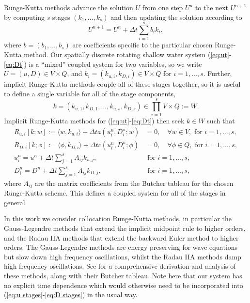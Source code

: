 \documentclass[a4paper, 12pt]{article}
\begin{document}
Runge-Kutta methods advance the solution $U$ from one step $U^n$ to
the next $U^{n+1}$ by computing $s$ stages $(k_1,\ldots,k_s)$ and then
updating the solution according to
\begin{equation}
  U^{n+1} = U^n + \Delta t\sum_{i=1}^s b_i k_i,
\end{equation}
where $b=(b_1,\ldots, b_s)$ are coefficients specific to the
particular chosen Runge-Kutta method. Our spatially discrete rotating
shallow water system (\ref{eq:ut}-\ref{eq:Dt}) is a ``mixed'' coupled
system for two variables, so we write $U=(u,D)\in V\times Q$, and $k_i
= (k_{u,i},k_{D,i})\in V\times Q$ for $i=1,\ldots,s$. Further,
implicit Runge-Kutta methods couple all of these stages together, so it
is useful to define a single variable for all of the stage components,
\[
k = (k_{u,1},k_{D,1},\ldots,k_{u,s},k_{D,s}) \in
\prod_{i=1}^s V\times Q := W.
\]
Implicit Runge-Kutta methods for (\ref{eq:ut}-\ref{eq:Dt}) then 
seek $k\in W$ such that
\begin{align}
    \label{eq:u stages}
    R_{u,i}[k;w] := \langle w, k_{u,i} \rangle + \Delta t a\left(
    u^n_i,D^n_i;w\right)
  & = 0,  
  \quad \forall w \in V,\mbox{ for }i=1,\ldots,s, \\
  \label{eq:D stages}
  R_{D,i}[k;\phi] := \langle \phi, k_{D,i} \rangle + \Delta tc\left(u^n_i,D^n_i; \phi\right)
  & = 0, \quad \forall \phi \in Q, \mbox{ for }i=1,\ldots,s,\\
  u^n_i = u^n + \Delta t\sum_{j=1}^sA_{ij}k_{u,j}, & \mbox{ for }i=1,\ldots,s,\\
  D^n_i = D^n + \Delta t\sum_{j=1}^sA_{ij}k_{D,j}, & \mbox{ for }i=1,\ldots,s,
\end{align}
where $A_{ij}$ are the matrix coefficients from the Butcher
tableau for the chosen Runge-Kutta scheme. This defines a coupled
system for all of the stages in general.

In this work
we consider collocation Runge-Kutta methods, in particular the
Gauss-Legendre methods that extend the implicit midpoint rule to
higher orders, and the Radau IIA methods that extend the backward Euler
method to higher orders. The Gauss-Legendre methods are energy
preserving for wave equations but slow down high frequency
oscillations, whilst the Radau IIA methods damp high frequency
oscillations.  See \citet{wanner1996solving} for a comprehensive
derivation and analysis of these methods, along with their Butcher
tableau. Note here that our system has no explicit time dependence
which would otherwise need to be incorporated into (\ref{eq:u
  stages}-\ref{eq:D stages}) in the usual way.
\end{document}
